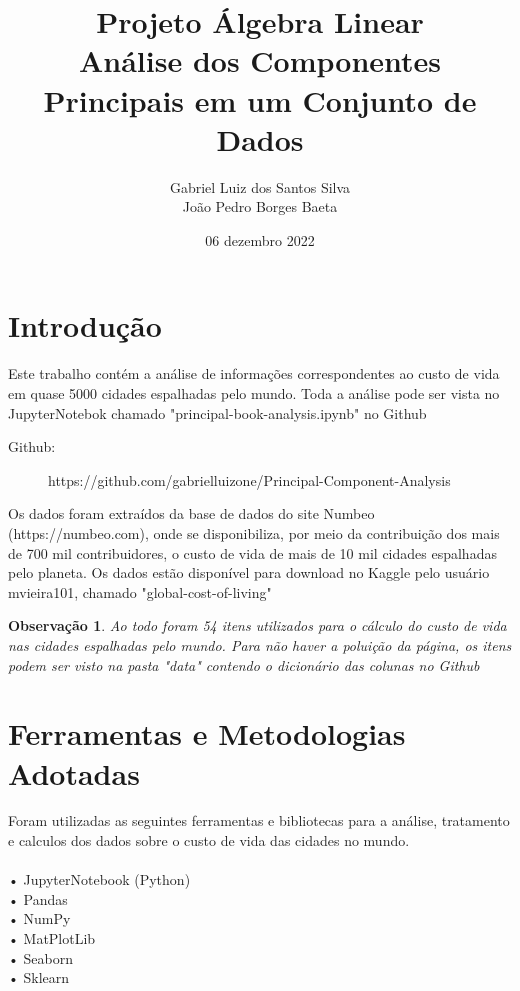 \documentclass[11pt,a4paper]{article}
\title {Projeto Álgebra Linear \\[1ex] \large Análise dos Componentes Principais em um Conjunto de Dados}
\author{Gabriel Luiz dos Santos Silva\\
João Pedro Borges Baeta
}
\date{06 dezembro 2022}
\newtheorem{3}{Observação}
\begin{document}
\maketitle



\section{Introdução}
Este trabalho contém a análise de informações correspondentes ao custo de vida em quase 5000 cidades espalhadas pelo mundo. Toda a análise pode ser vista no JupyterNotebok chamado "principal-book-analysis.ipynb" no Github

\begin{description}
\item[Github:] https://github.com/gabrielluizone/Principal-Component-Analysis
\end{description}

Os dados foram extraídos da base de dados do site Numbeo (https://numbeo.com), onde se disponibiliza, por meio da contribuição dos mais de 700 mil contribuidores, o custo de vida de mais de 10 mil cidades espalhadas pelo planeta.  Os dados estão disponível para download no Kaggle pelo usuário mvieira101, chamado "global-cost-of-living"

\begin{3} \normalfont
Ao todo foram 54 itens utilizados para o cálculo do custo de vida nas cidades espalhadas pelo mundo. Para não haver a poluição da página, os itens podem ser visto na pasta "data" contendo o dicionário das colunas no Github
\end{3}

\section{Ferramentas e Metodologias Adotadas}
Foram utilizadas as seguintes ferramentas e bibliotecas para a análise, tratamento e calculos dos dados sobre o custo de vida das cidades no mundo.\\\\
• JupyterNotebook (Python)\\
• Pandas\\
• NumPy\\
• MatPlotLib\\
• Seaborn\\
• Sklearn\\
\end{document}
